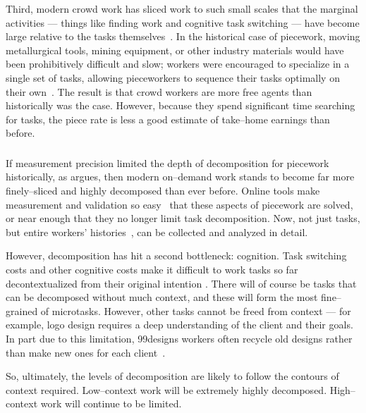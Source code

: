 \documentclass[trackingWork]{subfiles}
\begin{document}
Third, modern crowd work has sliced work to such small scales that the marginal activities
--- things like finding work and cognitive task switching ---
have become large relative to the tasks themselves~\cite{taskSearch}.
In the historical case of piecework,
moving metallurgical tools, mining equipment, or
other industry materials would have been prohibitively difficult and slow;
workers were encouraged to specialize in a single set of tasks,
allowing pieceworkers to sequence their tasks optimally on their own~\cite{hart2013rise}.
The result is that crowd workers are more free agents than historically was the case.
However, because they spend significant time searching for tasks, the piece rate is less a good estimate of take--home earnings than before.


\subsubsection{\implication}
If measurement precision limited the depth of decomposition for piecework historically, as \citeauthor{10.2307/23702539} argues, then modern on--demand work stands to become far more finely--sliced and highly decomposed than ever before.
Online tools make measurement and validation so easy~\cite{rzeszotarski2011instrumenting} that these aspects of piecework are solved, or near enough that they no longer limit task decomposition.
Now, not just tasks, but entire workers' histories~\cite{hata2017glimpse}, can be collected and analyzed in detail.

However, decomposition has hit a second bottleneck: cognition. 
Task switching costs and other cognitive costs make it difficult to work tasks so far decontextualized from their original intention \cite{delayAndOrderLasecki}.
There will of course be tasks that can be decomposed without much context, and these will form the most fine--grained of microtasks.
However, other tasks cannot be freed from context --- for example, logo design requires a deep understanding of the client and their goals.
In part due to this limitation, 99designs workers often recycle old designs rather than make new ones for each client~\cite{araujo201399designs}.

So, ultimately, the levels of decomposition are likely to follow the contours of context required. Low--context work will be extremely highly decomposed. High--context work will continue to be limited.


\end{document}

